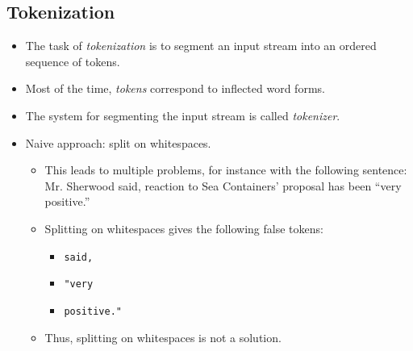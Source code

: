 		\subsection{Tokenization} %
			\begin{itemize}
				\item The task of \textit{tokenization} is to segment an input stream into an ordered sequence of tokens.
				\item Most of the time, \textit{tokens} correspond to inflected word forms.
				\item The system for segmenting the input stream is called \textit{tokenizer}.
				\item Naive approach: split on whitespaces.
					\begin{itemize}
						\item This leads to multiple problems, for instance with the following sentence: \\ Mr. Sherwood said, reaction to Sea Containers' proposal has been \enquote{very positive.}
						\item Splitting on whitespaces gives the following false tokens:
							\begin{itemize}
								\item \verb$said,$
								\item \verb$"very$
								\item \verb$positive."$
							\end{itemize}
						\item Thus, splitting on whitespaces is not a solution.
					\end{itemize}
			\end{itemize}

